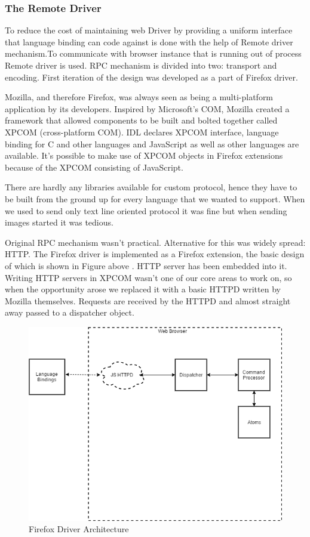 \documentclass[article,type=msc,colorback,accentcolor=tud9c,twoside,11pt]{tudthesis}
\begin{document}
\subsubsection{The Remote Driver}

To reduce the cost of maintaining web Driver by providing a uniform interface that language binding can code against is done with the help of Remote driver mechanism.To communicate with browser instance that is running out of process Remote driver is used. RPC mechanism is divided into two: transport and encoding. First iteration of the design was developed as a part of Firefox driver.

Mozilla, and therefore Firefox, was always seen as being a multi-platform application by its developers. Inspired by Microsoft's COM, Mozilla created a framework that allowed components to be built and bolted together called XPCOM (cross-platform COM).  IDL declares XPCOM interface, language binding for C and other languages and JavaScript as well as other languages are available. It's possible to make use of XPCOM objects in Firefox extensions because of the XPCOM consisting of JavaScript.

There are hardly any libraries available for custom protocol, hence they have to be built from the ground up for every language that we wanted to support. When we used to send only text line oriented protocol it was fine but when sending images started it was tedious.

Original RPC mechanism wasn't practical. Alternative for this was widely spread: HTTP. The Firefox driver is implemented as a Firefox extension, the basic design of which is shown in Figure above . HTTP server has been embedded into it. Writing HTTP servers in XPCOM wasn't one of our core areas to work on, so when the opportunity arose we replaced it with a basic HTTPD written by Mozilla themselves. Requests are received by the HTTPD and almost straight away passed to a dispatcher object.

\begin{figure}[h]
	\centering
	\includegraphics[scale=0.6]{SeleniumHttp.PNG}
	\caption{Firefox Driver Architecture}
	\label{fig:Flowchart}
\end{figure}
\end{document}
